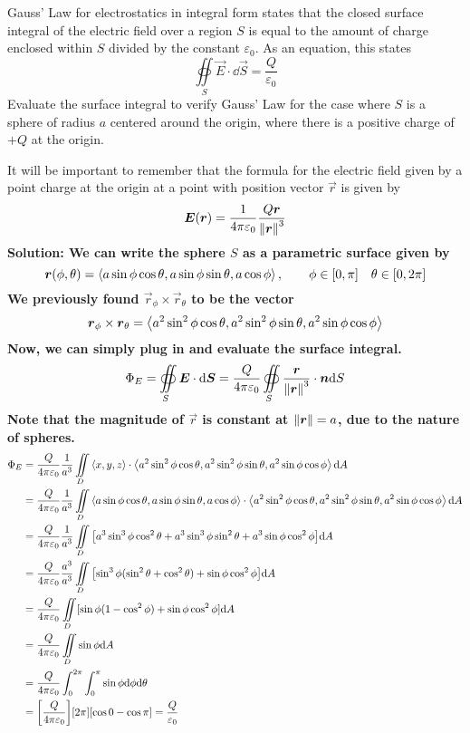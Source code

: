 \begin{example}
    Gauss' Law for electrostatics in integral form states that the closed surface integral of the electric field over a region $S$ is equal to the amount of charge enclosed within $S$ divided by the constant $\varepsilon_0$. As an equation, this states
    \[ \oiint\limits_S \vec E \cdot \dd \vec S = \frac{Q}{\varepsilon_0}\]
    Evaluate the surface integral to verify Gauss' Law for the case where $S$ is a sphere of radius $a$ centered around the origin, where there is a positive charge of $+Q$ at the origin. \par
    It will be important to remember that the formula for the electric field given by a point charge at the origin at a point with position vector $\vec r$ is given by \[ \boldsymbol{E}(\boldsymbol{r}) = \frac{1}{4\pi\varepsilon_0}\frac{Q\boldsymbol{r}}{\norm{\boldsymbol{r}}^3}\]
    \bf{Solution:} We can write the sphere $S$ as a parametric surface given by
    \[ \boldsymbol{r}(\phi, \theta) = \left\langle a\sin\phi\cos\theta, a\sin\phi\sin\theta, a\cos\phi\right\rangle, \qquad \phi\in[0,\pi]\quad \theta\in[0,2\pi]\]
    We previously found $\vec r_\phi\times \vec r_\theta$ to be the vector \[\boldsymbol{r}_\phi\times \boldsymbol{r}_\theta = \left\langle a^2\sin^2\phi\cos\theta, a^2\sin^2\phi\sin\theta, a^2\sin\phi\cos\phi\right\rangle\]
    Now, we can simply plug in and evaluate the surface integral.
    \[ \Phi_E = \oiint\limits_S \boldsymbol{E} \cdot \dd \boldsymbol{S} = \frac{Q}{4\pi\varepsilon_0}\oiint\limits_S \frac{\boldsymbol{r}}{\norm{\boldsymbol{r}}^3}\cdot \boldsymbol{n}\dd S\]
    Note that the magnitude of $\vec r$ is constant at $\norm{\boldsymbol{r}} = a$, due to the nature of spheres.
    \begin{align*}
        \Phi_E &= \frac{Q}{4\pi\varepsilon_0}\frac{1}{a^3}\iint\limits_D \<x,y,z\> \cdot \< a^2\sin^2\phi\cos\theta, a^2\sin^2\phi\sin\theta, a^2\sin\phi\cos\phi\> \dd A \\
        &= \frac{Q}{4\pi\varepsilon_0}\frac{1}{a^3}\iint\limits_D \<a\sin\phi\cos\theta,a\sin\phi\sin\theta,a\cos\phi\> \cdot \< a^2\sin^2\phi\cos\theta, a^2\sin^2\phi\sin\theta, a^2\sin\phi\cos\phi\> \dd A \\
        &= \frac{Q}{4\pi\varepsilon_0}\frac{1}{a^3}\iint\limits_D \bqty{a^3\sin^3\phi\cos^2\theta + a^3\sin^3\phi\sin^2\theta+a^3\sin\phi\cos^2\phi}\dd A \\
        &=\frac{Q}{4\pi\varepsilon_0}\frac{a^3}{a^3}\iint\limits_D\bqty{\sin^3\phi(\sin^2\theta+\cos^2\theta)+\sin\phi\cos^2\phi}\dd A \\
        &= \frac{Q}{4\pi\varepsilon_0}\iint\limits_D [\sin\phi(1-\cos^2\phi) + \sin\phi\cos^2\phi]\dd A \\
        &= \frac{Q}{4\pi\varepsilon_0}\iint\limits_D \sin\phi \dd A \\
        &= \frac{Q}{4\pi\varepsilon_0}\int_0^{2\pi}\int_0^{\pi}\sin\phi \dd \phi \dd \theta \\
        &= \bqty{ \frac{Q}{4\pi\varepsilon_0}}\bqty{2\pi}\bqty{\cos 0 - \cos \pi} = \frac{Q}{\varepsilon_0}
    \end{align*}
\end{example}
